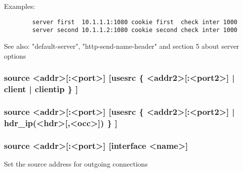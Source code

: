   Examples:
  \begin{verbatim}
        server first  10.1.1.1:1080 cookie first  check inter 1000
        server second 10.1.1.2:1080 cookie second check inter 1000
  \end{verbatim}

  See also: "default-server", "http-send-name-header" and section 5 about
             server options

\subsubsection[source]{source <addr>[:<port>] [usesrc \{ <addr2>[:<port2>] | client | clientip \} ]}
\subsubsection*{source <addr>[:<port>] [usesrc \{ <addr2>[:<port2>] | hdr\_ip(<hdr>[,<occ>]) \} ]}
\subsubsection*{source <addr>[:<port>] [interface <name>]}


  Set the source address for outgoing connections


